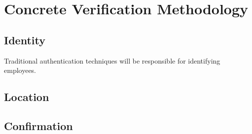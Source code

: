\section{Concrete Verification Methodology}




\subsection{Identity}

Traditional authentication techniques will be responsible
for identifying employees. 

\subsection{Location}



\subsection{Confirmation}